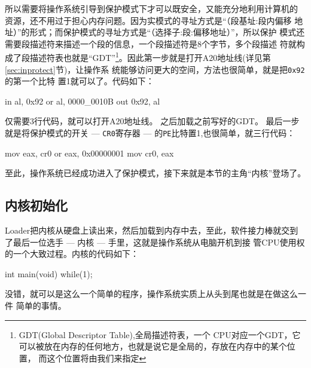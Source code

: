 所以需要将操作系统引导到保护模式下才可以既安全，又能充分地利用计算机的
资源，还不用过于担心内存问题。因为实模式的寻址方式是“（段基址:段内偏移
地址）”的形式；而保护模式的寻址方式是“（选择子:段:偏移地址）”，所以保护
模式还需要段描述符来描述一个段的信息，一个段描述符是8个字节，多个段描述
符就构成了段描述符表也就是“GDT”\footnote{GDT(Global Descriptor Table)\cite{chxs2012},全局描述符表，一个
  CPU对应一个GDT，它可以被放在内存的任何地方，也就是说它是全局的，存放在内存中的某个位置，
  而这个位置将由我们来指定}。因此第一步就是打开A20地址线(详见第\ref{sec:inprotect}节)，让操作系
统能够访问更大的空间，方法也很简单，就是把\texttt{0x92}的第一个比特
置1就可以了。代码如下：
\begin{codeblock}
\begin{nasmcode}
in al, 0x92
or al, 0000_0010B
out 0x92, al
\end{nasmcode}  
\end{codeblock}
仅需要3行代码，就可以打开A20地址线。
之后加载之前写好的GDT。
最后一步就是将保护模式的开关 --- \texttt{CR0}寄存器 --- 的\texttt{PE}比特置1,也很简单，就三行代码：

\begin{codeblock}
\begin{nasmcode}
mov eax, cr0
or  eax, 0x00000001
mov cr0, eax
\end{nasmcode}  
\end{codeblock}

至此，操作系统已经成功进入了保护模式，接下来就是本节的主角“内核”登场了。

\subsection{内核初始化}

Loader把内核从硬盘上读出来，然后加载到内存中去，至此，软件接力棒就交到
了最后一位选手 --- 内核 --- 手里，这就是操作系统从电脑开机到接
管CPU使用权的一个大致过程。内核的代码如下：

\begin{codeblock}
\begin{ccode}
int main(void)
{
    while(1);
}
\end{ccode}  
\end{codeblock}

没错，就可以是这么一个简单的程序，操作系统实质上从头到尾也就是在做这么一件
简单的事情。


